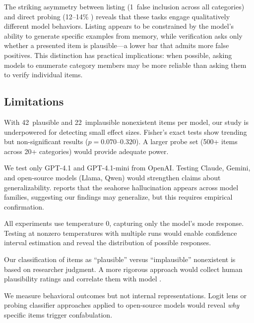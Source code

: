 The striking asymmetry between listing (1~false inclusion across all categories) and direct probing (12--14\% \fpr) reveals that these tasks engage qualitatively different model behaviors.
Listing appears to be constrained by the model's ability to generate specific examples from memory, while verification asks only whether a presented item is plausible---a lower bar that admits more false positives.
This distinction has practical implications: when possible, asking models to enumerate category members may be more reliable than asking them to verify individual items.

\subsection{Limitations}
\label{sec:limitations}

With 42~plausible and 22~implausible nonexistent items per model, our study is underpowered for detecting small effect sizes.
Fisher's exact tests show trending but non-significant results ($p = 0.070$--$0.320$).
A larger probe set (500+ items across 20+ categories) would provide adequate power.

We test only GPT-4.1 and GPT-4.1-mini from OpenAI.
Testing Claude, Gemini, and open-source models (Llama, Qwen) would strengthen claims about generalizability.
\citet{vogel2026seahorse} reports that the seahorse hallucination appears across model families, suggesting our findings may generalize, but this requires empirical confirmation.

All experiments use temperature 0, capturing only the model's mode response.
Testing at nonzero temperatures with multiple runs would enable confidence interval estimation and reveal the distribution of possible responses.

Our classification of items as ``plausible'' versus ``implausible'' nonexistent is based on researcher judgment.
A more rigorous approach would collect human plausibility ratings and correlate them with model \fpr.

We measure behavioral outcomes but not internal representations.
Logit lens or probing classifier approaches \cite{vogel2026seahorse} applied to open-source models would reveal \emph{why} specific items trigger confabulation.
